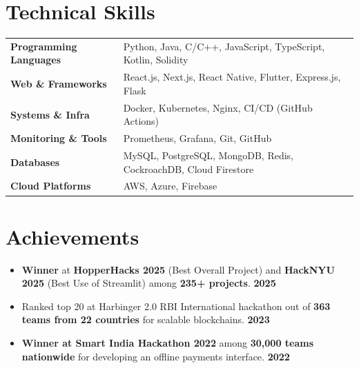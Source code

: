 \documentclass[a4,10pt]{article}
\newenvironment{zitemize}{
\begin{itemize}\itemsep0pt \parskip0pt \parsep1pt}
{\end{itemize}\vspace{-0.5cm}}
\newcommand{\hskills}[1]{
\textbf{\bfseries #1} }
\begin{document}


\section{Technical Skills}
\vspace{-0.2cm}
\begin{tabular}{p{13em} p{32em}}
\hskills{Programming Languages} & Python, Java, C/C++, JavaScript, TypeScript, Kotlin, Solidity \\
\hskills{Web \& Frameworks} & React.js, Next.js, React Native, Flutter, Express.js, Flask \\
\hskills{Systems \& Infra} & Docker, Kubernetes, Nginx, CI/CD (GitHub Actions) \\
\hskills{Monitoring \& Tools} & Prometheus, Grafana, Git, GitHub \\
\hskills{Databases} & MySQL, PostgreSQL, MongoDB, Redis, CockroachDB, Cloud Firestore \\
\hskills{Cloud Platforms} & AWS, Azure, Firebase \\
\end{tabular}
\vspace{-0.5cm}


\section{Achievements}
\vspace{-0.1cm}

\begin{zitemize}
    \item \textbf{Winner} at \textbf{HopperHacks 2025} (Best Overall Project) and \textbf{HackNYU 2025} (Best Use of Streamlit) among \textbf{235+ projects}. \hfill \textbf{2025}
    \item Ranked top 20 at Harbinger 2.0 RBI International hackathon out of \textbf{363 teams from 22 countries} for scalable blockchains. \hfill \textbf{2023}
    \item \textbf{Winner at Smart India Hackathon 2022} among \textbf{30,000 teams nationwide} for developing an offline payments interface. \hfill \textbf{2022}
\end{zitemize}
\vspace{-0.2cm}
\end{document}
